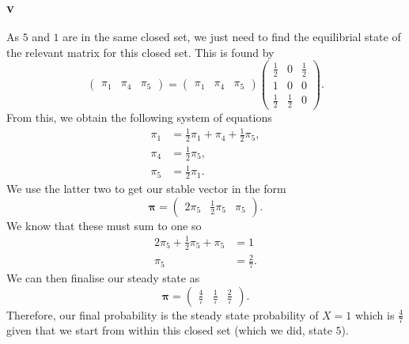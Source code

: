 \documentclass{article}
\begin{document}
\subsubsection{v}
As $5$ and $1$ are in the same closed set, we just need to find the equilibrial state of the relevant matrix for this closed set. This is found by
\begin{equation}
    \begin{pmatrix}
        \pi_1 & \pi_4 & \pi_5
    \end{pmatrix} = \begin{pmatrix}
        \pi_1 & \pi_4 & \pi_5
    \end{pmatrix}\begin{pmatrix}
        \frac{1}{2} & 0 & \frac{1}{2} \\
        1 & 0 & 0 \\
        \frac{1}{2} & \frac{1}{2} & 0
    \end{pmatrix}.
\end{equation}
From this, we obtain the following system of equations
\begin{align}
    \pi_1 &= \frac{1}{2}\pi_1 + \pi_4 + \frac{1}{2}\pi_5, \\
    \pi_4 &= \frac{1}{2}\pi_5,\\ 
    \pi_5 &= \frac{1}{2}\pi_1.
\end{align}
We use the latter two to get our stable vector in the form
\begin{equation}
    \boldsymbol{\pi} = \begin{pmatrix}
        2\pi_5 & \frac{1}{2}\pi_5 & \pi_5
    \end{pmatrix}.
\end{equation}
We know that these must sum to one so
\begin{align}
    2\pi_5 + \frac{1}{2}\pi_5 + \pi_5 &= 1 \\
    \pi_5 &= \frac{2}{7}.
\end{align}
We can then finalise our steady state as 
\begin{equation}
    \boldsymbol{\pi} = \begin{pmatrix}
        \frac{4}{7} & \frac{1}{7} & \frac{2}{7}
    \end{pmatrix}.
\end{equation}
Therefore, our final probability is the steady state probability of $X=1$ which is $\frac{4}{7}$ given that we start from within this closed set (which we did, state $5$).
\end{document}
